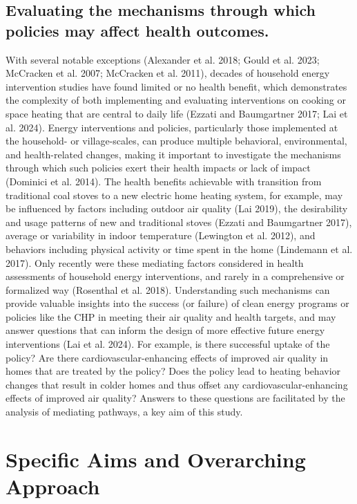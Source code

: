 \documentclass[
  letterpaper,
  DIV=11,
  numbers=noendperiod]{scrartcl}
\begin{document}
\subsection{Evaluating the mechanisms through which policies may affect
health
outcomes.}\label{evaluating-the-mechanisms-through-which-policies-may-affect-health-outcomes.}

With several notable exceptions (Alexander et al. 2018; Gould et al.
2023; McCracken et al. 2007; McCracken et al. 2011), decades of
household energy intervention studies have found limited or no health
benefit, which demonstrates the complexity of both implementing and
evaluating interventions on cooking or space heating that are central to
daily life (Ezzati and Baumgartner 2017; Lai et al. 2024). Energy
interventions and policies, particularly those implemented at the
household- or village-scales, can produce multiple behavioral,
environmental, and health-related changes, making it important to
investigate the mechanisms through which such policies exert their
health impacts or lack of impact (Dominici et al. 2014). The health
benefits achievable with transition from traditional coal stoves to a
new electric home heating system, for example, may be influenced by
factors including outdoor air quality (Lai 2019), the desirability and
usage patterns of new and traditional stoves (Ezzati and Baumgartner
2017), average or variability in indoor temperature (Lewington et al.
2012), and behaviors including physical activity or time spent in the
home (Lindemann et al. 2017). Only recently were these mediating factors
considered in health assessments of household energy interventions, and
rarely in a comprehensive or formalized way (Rosenthal et al. 2018).
Understanding such mechanisms can provide valuable insights into the
success (or failure) of clean energy programs or policies like the CHP
in meeting their air quality and health targets, and may answer
questions that can inform the design of more effective future energy
interventions (Lai et al. 2024). For example, is there successful uptake
of the policy? Are there cardiovascular-enhancing effects of improved
air quality in homes that are treated by the policy? Does the policy
lead to heating behavior changes that result in colder homes and thus
offset any cardiovascular-enhancing effects of improved air quality?
Answers to these questions are facilitated by the analysis of mediating
pathways, a key aim of this study.

\section{Specific Aims and Overarching
Approach}\label{specific-aims-and-overarching-approach}
\end{document}
